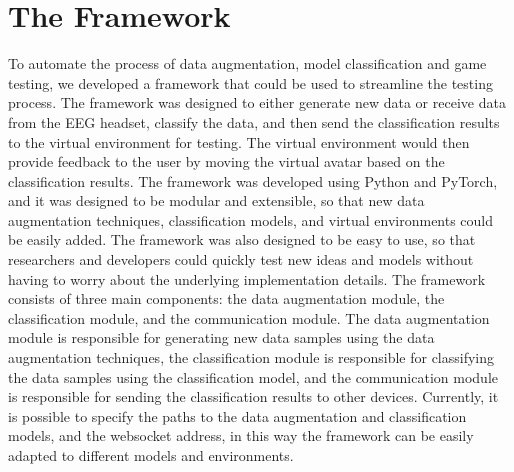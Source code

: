 \section{The Framework}
To automate the process of data augmentation, model classification and game testing, we developed a framework that could be used to streamline the testing process.
The framework was designed to either generate new data or receive data from the EEG headset, classify the data, and then send the classification results to the virtual environment for testing.
The virtual environment would then provide feedback to the user by moving the virtual avatar based on the classification results.
The framework was developed using Python and PyTorch, and it was designed to be modular and extensible, so that new data augmentation techniques, classification models, and virtual environments could be easily added.
The framework was also designed to be easy to use, so that researchers and developers could quickly test new ideas and models without having to worry about the underlying implementation details.
The framework consists of three main components: the data augmentation module, the classification module, and the communication module.
The data augmentation module is responsible for generating new data samples using the data augmentation techniques, the classification module is responsible for classifying the data samples using the classification model, and the communication module is responsible for sending the classification results to other devices.
Currently, it is possible to specify the paths to the data augmentation and classification models, and the websocket address, in this way the framework can be easily adapted to different models and environments.
